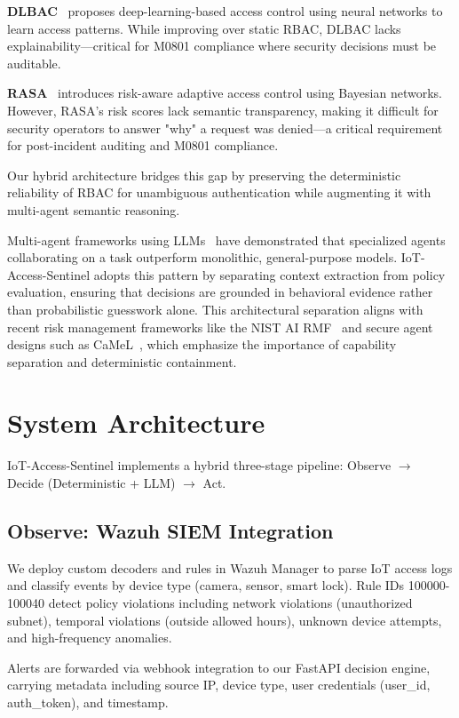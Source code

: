 \documentclass[conference]{IEEEtran}
\begin{document}
\textbf{DLBAC}~\cite{dlbac2022} proposes deep-learning-based access control using neural networks to learn access patterns. While improving over static RBAC, DLBAC lacks explainability—critical for M0801 compliance where security decisions must be auditable.

\textbf{RASA}~\cite{rasa2021} introduces risk-aware adaptive access control using Bayesian networks. However, RASA's risk scores lack semantic transparency, making it difficult for security operators to answer "why" a request was denied—a critical requirement for post-incident auditing and M0801 compliance.

Our hybrid architecture bridges this gap by preserving the deterministic reliability of RBAC for unambiguous authentication while augmenting it with multi-agent semantic reasoning.

Multi-agent frameworks using LLMs~\cite{multiagent2023} have demonstrated that specialized agents collaborating on a task outperform monolithic, general-purpose models. IoT-Access-Sentinel adopts this pattern by separating context extraction from policy evaluation, ensuring that decisions are grounded in behavioral evidence rather than probabilistic guesswork alone. This architectural separation aligns with recent risk management frameworks like the NIST AI RMF~\cite{nist_airmf_2023} and secure agent designs such as CaMeL~\cite{camel2024}, which emphasize the importance of capability separation and deterministic containment.

\section{System Architecture}

IoT-Access-Sentinel implements a hybrid three-stage pipeline: Observe $\rightarrow$ Decide (Deterministic + LLM) $\rightarrow$ Act.

\subsection{Observe: Wazuh SIEM Integration}

We deploy custom decoders and rules in Wazuh Manager to parse IoT access logs and classify events by device type (camera, sensor, smart lock). Rule IDs 100000-100040 detect policy violations including network violations (unauthorized subnet), temporal violations (outside allowed hours), unknown device attempts, and high-frequency anomalies.

Alerts are forwarded via webhook integration to our FastAPI decision engine, carrying metadata including source IP, device type, user credentials (user\_id, auth\_token), and timestamp.
\end{document}
